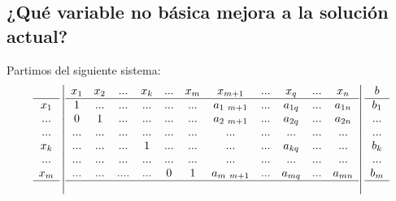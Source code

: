 \subsection{¿Qué variable no básica mejora a la solución actual?}
Partimos del siguiente sistema:
$$
\begin{array}{c}
  \\ \hline
  x_1 \\
  ... \\
  ... \\
  x_k \\
  ... \\
  x_m \\ \hline
  ~
\end{array}
\left|
  \begin{array}{cccccc}
    x_1 & x_2 & ... & x_k & ... & x_m \\ \hline
    1 & ... & ... &...& ...& ... \\
    0 & 1 & ... & ...& ...& ... \\
    ... & ... & ... & ... & ...& ... \\
    ... & ... & ... & 1 & ...& ... \\
    ... & ... & ... & ... & ...& ... \\
    ... & ...& .... & ... &  0  & 1\\ \hline
        & & & 
  \end{array}
  \begin{array}{ccccc}
    x_{m+1} & ... & x_q & ... & x_n \\ \hline
    a_{1 ~ m+1} & ... & a_{1q} & ... & a_{1n} \\
    a_{2 ~ m+1} & ... & a_{2q} & ... & a_{2n} \\
    ... & ... & ... & ...& ... \\
    ... & ... & a_{kq} & ...& ... \\
    ... & ... & ... & ...& ... \\
    a_{m ~ m+1} & ... & a_{mq} & ... & a_{mn} \\ \hline
            & & & &
  \end{array}
\right|
\begin{array}{c}
  b \\ \hline
  b_1 \\
  ... \\
  ... \\
  b_k \\
  ... \\
  b_m \\ \hline
  ~
\end{array}
$$
